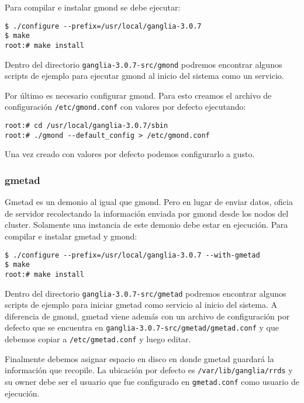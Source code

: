 \documentclass[a4paper,10pt,spanish]{article}
\begin{document}
Para compilar e instalar gmond se debe ejecutar:

\begin{verbatim}
$ ./configure --prefix=/usr/local/ganglia-3.0.7
$ make
root:# make install
\end{verbatim}

Dentro del directorio \mbox{\texttt{ganglia-3.0.7-src/gmond}} podremos encontrar algunos scripts de ejemplo para ejecutar gmond al inicio del sistema como un servicio. 

Por \'{u}ltimo es necesario configurar gmond. Para esto creamos el archivo de configuraci\'{o}n \mbox{\texttt{/etc/gmond.conf}} con valores por defecto ejecutando:

\begin{verbatim}
root:# cd /usr/local/ganglia-3.0.7/sbin
root:# ./gmond --default_config > /etc/gmond.conf
\end{verbatim}

Una vez creado con valores por defecto podemos configurarlo a gusto.

\subsubsection{gmetad}

Gmetad es un demonio al igual que gmond. Pero en lugar de enviar datos, oficia de servidor recolectando la informaci\'{o}n enviada por gmond desde los nodos del cluster. Solamente una instancia de este demonio debe
estar en ejecuci\'{o}n. Para compilar e instalar gmetad y gmond:

\begin{verbatim}
$ ./configure --prefix=/usr/local/ganglia-3.0.7 --with-gmetad 
$ make
root:# make install
\end{verbatim}

Dentro del directorio \mbox{\texttt{ganglia-3.0.7-src/gmetad}} podremos encontrar algunos scripts de ejemplo para iniciar gmetad como servicio al inicio del sistema. A diferencia de gmond, gmetad viene adem\'{a}s con un archivo de configuraci\'{o}n por defecto que se encuentra en \mbox{\texttt{ganglia-3.0.7-src/gmetad/gmetad.conf}} y que debemos copiar a \mbox{\texttt{/etc/gmetad.conf}} y luego editar.

Finalmente debemos asignar espacio en disco en donde gmetad guardar\'{a} la informaci\'{o}n que recopile. La ubicaci\'{o}n por defecto es \mbox{\texttt{/var/lib/ganglia/rrds}} y su owner debe ser el usuario que fue configurado en \texttt{gmetad.conf} como usuario de ejecuci\'{o}n.
\end{document}
